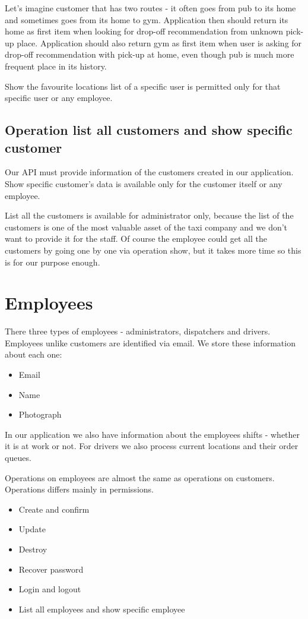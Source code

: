 			Let's imagine customer that has two routes - it often goes from pub to its home and sometimes goes from its home to gym. Application then should return its home as first item when looking for drop-off recommendation from unknown pick-up place. Application should also return gym as first item when user is asking for drop-off recommendation with pick-up at home, even though pub is much more frequent place in its history.
			
			 Show the favourite locations list of a specific user is permitted only for that specific user or any employee.
		 
		\subsection{Operation list all customers and show specific customer}
			Our API must provide information of the customers created in our application.
			Show specific customer's data is available only for the customer itself or any employee. 
			
			List all the customers is available for administrator only, because the list of the customers is one of the most valuable asset of the taxi company and we don't want to provide it for the staff. Of course the employee could get all the customers by going one by one via operation show, but it takes more time so this is for our purpose enough.
		
	\section{Employees}
		There three types of employees - administrators, dispatchers and drivers. Employees unlike customers are identified via email. We store these information about each one:
		\begin{itemize}
			\item Email
			\item Name
			\item Photograph
		\end{itemize}
		
		In our application we also have information about the employees shifts - whether it is at work or not. For drivers we also process current locations and their order queues. 
		
		Operations on employees are almost the same as operations on customers. Operations differs mainly in permissions. 
		\begin{itemize}
			\item Create and confirm
			\item Update
			\item Destroy
			\item Recover password
			\item Login and logout
			\item List all employees and show specific employee
		\end{itemize}
		
